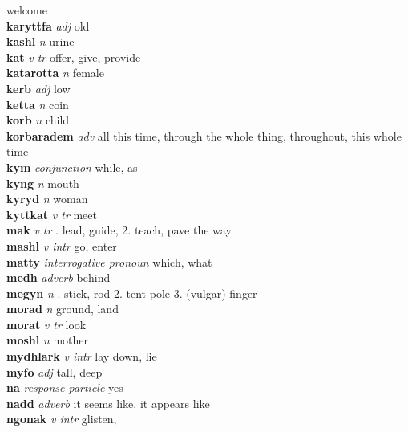 welcome\\\textbf{karyttfa}   \emph{adj} \textperiodcentered old\\\textbf{kashl}   \emph{n} \textperiodcentered urine\\\textbf{kat}   \emph{v tr} \textperiodcentered offer, give, provide\\\textbf{katarotta}   \emph{n} \textperiodcentered female\\\textbf{kerb}   \emph{adj} \textperiodcentered low\\\textbf{ketta}   \emph{n} \textperiodcentered coin\\\textbf{korb}   \emph{n} \textperiodcentered child\\\textbf{korbaradem}   \emph{adv} \textperiodcentered all this time, through the whole thing, throughout, this whole time\\\textbf{kym}   \emph{conjunction} \textperiodcentered while, as\\\textbf{kyng}   \emph{n} \textperiodcentered mouth\\\textbf{kyryd}   \emph{n} \textperiodcentered woman\\\textbf{kyttkat}   \emph{v tr} \textperiodcentered meet\\\textbf{mak}   \emph{v tr} . lead, guide, 2. teach, pave the way \\\textbf{mashl}   \emph{v intr} \textperiodcentered go, enter\\\textbf{matty}   \emph{interrogative pronoun} \textperiodcentered which, what\\\textbf{medh}   \emph{adverb} \textperiodcentered behind\\\textbf{megyn}   \emph{n} . stick, rod 2. tent pole 3. (vulgar) finger \\\textbf{morad}   \emph{n} \textperiodcentered ground, land\\\textbf{morat}   \emph{v tr} \textperiodcentered look\\\textbf{moshl}   \emph{n} \textperiodcentered mother\\\textbf{mydhlark}   \emph{v intr} \textperiodcentered lay down, lie\\\textbf{myfo}   \emph{adj} \textperiodcentered tall, deep\\\textbf{na}   \emph{response particle} \textperiodcentered yes\\\textbf{nadd}   \emph{adverb} \textperiodcentered it seems like, it appears like\\\textbf{ngonak}   \emph{v intr} \textperiodcentered glisten, 
